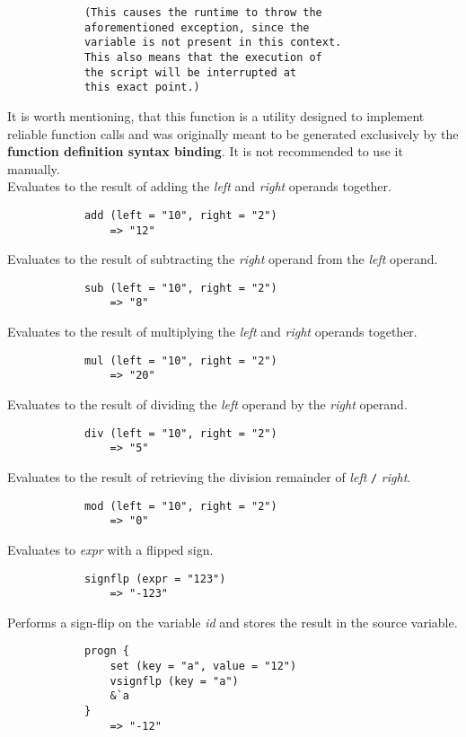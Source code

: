 \begin{multicols*}{2}
\begin{verbatim}
			(This causes the runtime to throw the
			aforementioned exception, since the
			variable is not present in this context.
			This also means that the execution of
			the script will be interrupted at
			this exact point.)
	\end{verbatim}
	It is worth mentioning, that this function is a utility designed to implement reliable function calls and was originally meant
	to be generated exclusively by the \textbf{function definition syntax binding}. It is not recommended to use it manually.\\[3mm]
	\vfill\columnbreak
	Evaluates to the result of adding the \textit{left} and \textit{right} operands together.
	\begin{verbatim}
			add (left = "10", right = "2")
			    => "12"
	\end{verbatim}
	Evaluates to the result of subtracting the \textit{right} operand from the \textit{left} operand.
	\begin{verbatim}
			sub (left = "10", right = "2")
			    => "8"
	\end{verbatim}
	Evaluates to the result of multiplying the \textit{left} and \textit{right} operands together.
	\begin{verbatim}
			mul (left = "10", right = "2")
			    => "20"
	\end{verbatim}
	Evaluates to the result of dividing the \textit{left} operand by the \textit{right} operand.
	\begin{verbatim}
			div (left = "10", right = "2")
			    => "5"
	\end{verbatim}
	Evaluates to the result of retrieving the division remainder of \textit{left} \verb|/| \textit{right}.
	\begin{verbatim}
			mod (left = "10", right = "2")
			    => "0"
	\end{verbatim}
	Evaluates to \textit{expr} with a flipped sign.
	\begin{verbatim}
			signflp (expr = "123")
			    => "-123"
	\end{verbatim}
	Performs a sign-flip on the variable \textit{id} and stores the result in the source variable.
	\begin{verbatim}
			progn {
			    set (key = "a", value = "12")
			    vsignflp (key = "a")
			    &`a
			}
			    => "-12"
	\end{verbatim}
	\vfill\columnbreak

\end{multicols*}
